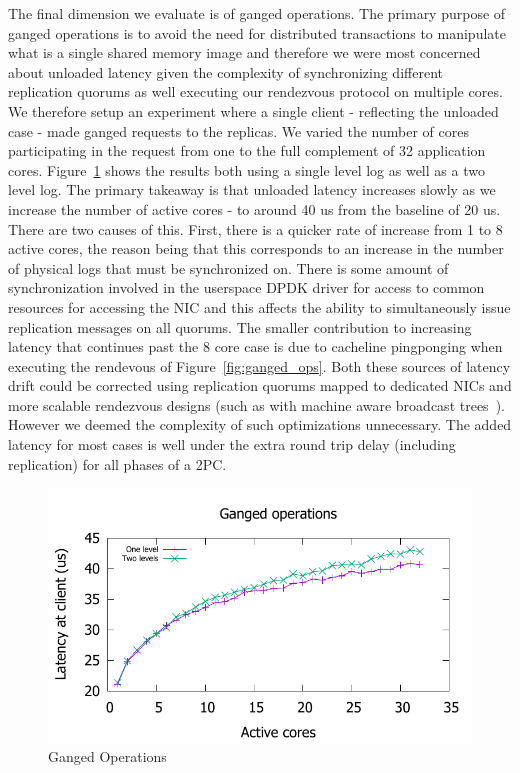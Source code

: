 \documentclass[pageno]{jpaper}
\begin{document}
The final dimension we evaluate is of ganged operations. The primary purpose of
ganged operations is to avoid the need for distributed transactions to
manipulate what is a single shared memory image and therefore we were most
concerned about unloaded latency given the complexity of synchronizing different
replication quorums as well executing our rendezvous protocol on multiple
cores. We therefore setup an experiment where a single client - reflecting the
unloaded case - made ganged requests to the replicas. We varied the number of
cores participating in the request from one to the full complement of 32
application cores. Figure~\ref{fig:ganged} shows the results both using a single
level log as well as a two level log. The primary takeaway is that unloaded
latency increases slowly as we increase the number of active cores - to around
40 us from the baseline of 20 us. There are two causes of this. First, there is
a quicker rate of increase from 1 to 8 active cores, the reason being that this
corresponds to an increase in the number of physical logs that must be
synchronized on. There is some amount of synchronization involved in the
userspace DPDK driver for access to common resources for accessing the NIC and
this affects the ability to simultaneously issue replication messages on all
quorums. The smaller contribution to increasing latency that continues past the
8 core case is due to cacheline pingponging when executing the rendevous of
Figure~\ref{fig:ganged_ops}. Both these sources of latency drift could be
corrected using replication quorums mapped to dedicated NICs and more scalable
rendezvous designs (such as with machine aware broadcast
trees~\cite{broadcast_tree}). However we deemed the complexity of such
optimizations unnecessary. The added latency for most cases is well under the
extra round trip delay (including replication) for all phases of a 2PC.

\begin{figure}
\includegraphics[scale=0.6]{results2/multi.pdf}
\caption{Ganged Operations}
\label{fig:ganged}
\end{figure}
\end{document}
